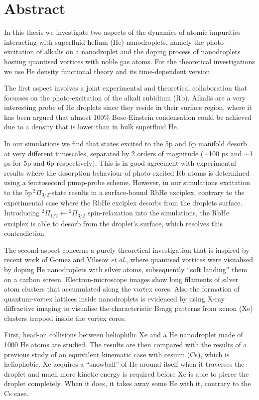 \chapter{Abstract}
	In this thesis we investigate two aspects of the dynamics of atomic impurities interacting with superfluid helium (He) nanodroplets, namely the photo-excitation of alkalis on a nanodroplet and the doping process of nanodroplets hosting quantised vortices with noble gas atoms. For the theoretical investigations we use He density functional theory and its time-dependent version.

	The first aspect involves a joint experimental and theoretical collaboration that focusses on the photo-excitation of the alkali rubidium (Rb). Alkalis are a very interesting probe of He droplets since they reside in their surface region, where it has been argued that almost 100\% Bose-Einstein condensation could be achieved due to a density that is lower than in bulk superfluid He.

	In our simulations we find that states excited to the 5p and 6p manifold desorb at very different timescales, separated by 2 orders of magnitude ($\sim$100 ps and $\sim$1 ps for 5p and 6p respectively). This is in good agreement with experimental results where the desorption behaviour of photo-excited Rb atoms is determined using a femtosecond pump-probe scheme. However, in our simulations excitation to the $5\mathrm{p}\,^2\Pi_{3/2}$-state results in a surface-bound RbHe exciplex, contrary to the experimental case where the RbHe exciplex desorbs from the droplets surface. Introducing $^2\Pi_{1/2}\leftarrow{^2}\Pi_{3/2}$ spin-relaxation into the simulations, the RbHe exciplex is able to desorb from the droplet's surface, which resolves this contradiction.

	The second aspect concerns a purely theoretical investigation that is inspired by recent work of Gomez and Vilesov \emph{et al}., where quantised vortices were visualised by doping He nanodroplets with silver atoms, subsequently ``soft landing'' them on a carbon screen. Electron-microscope images show long filaments of silver atom clusters that accumulated along the vortex cores. Also the formation of quantum-vortex lattices inside nanodroplets is evidenced by using X-ray diffractive imaging to visualise the characteristic Bragg patterns from xenon (Xe) clusters trapped inside the vortex cores.

	First, head-on collisions between heliophilic Xe and a He nanodroplet made of 1000 He atoms are studied. The results are then compared with the results of a previous study of an equivalent kinematic case with cesium (Cs), which is heliophobic. Xe acquires a ``snowball'' of He around itself when it traverses the droplet and much more kinetic energy is required before Xe is able to pierce the droplet completely. When it does, it takes away some He with it, contrary to the Cs case.

